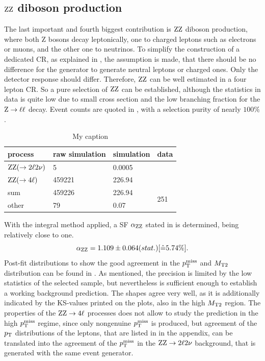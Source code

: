\subsection{$\mathrm{Z}\mathrm{Z}$ diboson production}
The last important and fourth biggest contribution is $\mathrm{Z}\mathrm{Z}$ diboson production, where both Z bosons decay leptonically, one to charged leptons such as electrons or muons, and the other one to neutrinos. To simplify the construction of a dedicated CR, as explained in , the assumption is made, that there should be no difference for the generator to generate neutral leptons or charged ones. Only the detector response should differ. Therefore, $\mathrm{Z}\mathrm{Z}$ can be well estimated in a four lepton CR. So a pure selection of $\mathrm{Z}\mathrm{Z}$ can be established, although the statistics in data is quite low due to small cross section and the low branching fraction for the $\mathrm{Z}\to\ell\ell$ decay. Event counts are quoted in , with a selection purity of nearly $100\%$.
\begin{table}[htb]
 \centering
 \caption{My caption}
 \label{tab:CRWT}
 \begin{tabular}{llll}
  
  process                 & raw simulation & simulation & data                 \\\hline
  $\mathrm{Z}\mathrm{Z}(\to2\ell2\nu)$ & 5              & 0.0005     &                      \\
  $\mathrm{Z}\mathrm{Z}(\to4\ell)$      & 459221         & 226.94     &                      \\\hline\hline
  sum                     & 459226         & 226.94     & \multirow{2}{*}{251} \\
  other                   & 79             & 0.07       &                      
 \end{tabular}
\end{table}
With the integral method applied, a SF $\alpha_{\mathrm{Z}\mathrm{Z}}$ stated in  is determined, being relatively close to one.
\begin{equation}\label{eq:AlphaZZ}
 \alpha_{\mathrm{Z}\mathrm{Z}}=1.109 \pm 0.064 (stat.) [\hat{=}5.74\%].
\end{equation}
Post-fit distributions to show the good agreement in the $p_{\mathrm{T}}^\text{miss}$ and $M_{\mathrm{T2}}$ distribution can be found in . As mentioned, the precision is limited by the low statistics of the selected sample, but nevertheless is sufficient enough to establish a working background prediction. The shapes agree very well, as it is additionally indicated by the KS-values printed on the plots, also in the high $M_{\mathrm{T2}}$ region. The properties of the $\mathrm{Z}\mathrm{Z}\to4\ell$ processes does not allow to study the prediction in the high $p_{\mathrm{T}}^\text{miss}$ regime, since only nongenuine $p_{\mathrm{T}}^\text{miss}$ is produced, but agreement of the $p_{\mathrm{T}}$ distributions of the leptons, that are listed in  in the appendix, can be translated into the agreement of the $p_{\mathrm{T}}^\text{miss}$ in the $\mathrm{Z}\mathrm{Z}\to2\ell2\nu$ background, that is generated with the same event generator.
